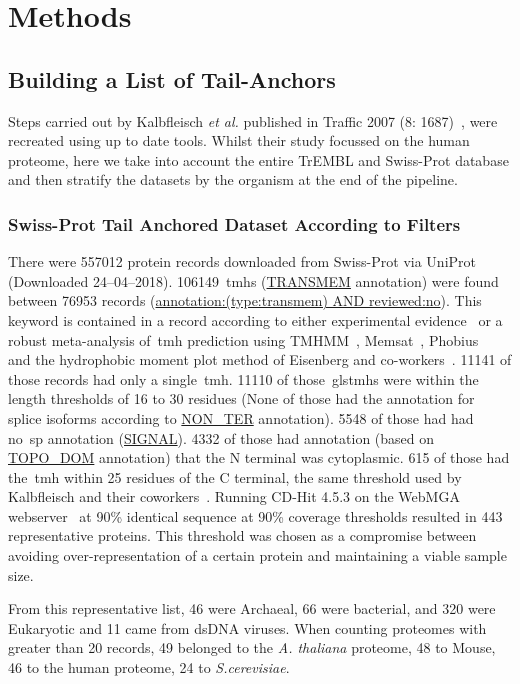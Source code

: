 \section{Methods}

\subsection{Building a List of Tail-Anchors}
Steps carried out by Kalbfleisch \textit{et al.} published in Traffic 2007 (8: 1687)~\cite{Kalbfleisch2007}, were recreated using up to date tools.
Whilst their study focussed on the human proteome, here we take into account the entire TrEMBL and Swiss-Prot database and then stratify the datasets by the organism at the end of the pipeline.

\subsubsection{Swiss-Prot Tail Anchored Dataset According to Filters}
There were 557012 protein records downloaded from Swiss-Prot via UniProt~\cite{TheUniProtConsortium2014} (Downloaded 24--04--2018).
106149~\gls{tmh}s (\url{TRANSMEM} annotation) were found between 76953 records (\url{annotation:(type:transmem) AND reviewed:no}).
This keyword is contained in a record according to either experimental evidence~\cite{TheUniProtConsortium2014} or a robust meta-analysis of~\gls{tmh} prediction using TMHMM~\cite{Krogh2001}, Memsat~\cite{Jones2007}, Phobius~\cite{Kall2004,Kall2007} and the hydrophobic moment plot method of Eisenberg and co-workers~\cite{Eisenberg1984}.
11141 of those records had only a single~\gls{tmh}.
11110 of those~gls{tmh}s were within the length thresholds of 16 to 30 residues (None of those had the annotation for splice isoforms according to \url{NON_TER} annotation).
5548 of those had had no~\gls{sp} annotation (\url{SIGNAL}).
4332 of those had annotation (based on \url{TOPO_DOM} annotation) that the N terminal was cytoplasmic.
615 of those had the~\gls{tmh} within 25 residues of the C terminal, the same threshold used by Kalbfleisch and their coworkers~\cite{Kalbfleisch2007}.
Running CD-Hit 4.5.3 on the WebMGA webserver~\cite{Huang2010, Wu2011} at 90\% identical sequence at 90\% coverage thresholds resulted in 443 representative proteins.
This threshold was chosen as a compromise between avoiding over-representation of a certain protein and maintaining a viable sample size.

From this representative list, 46 were Archaeal, 66 were bacterial, and 320 were Eukaryotic and 11 came from dsDNA viruses.
When counting proteomes with greater than 20 records, 49 belonged to the \textit{A. thaliana} proteome, 48 to Mouse, 46 to the human proteome, 24 to \textit{S.cerevisiae}. %

